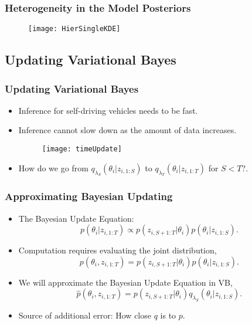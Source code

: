 \documentclass[11pt]{beamer}\usepackage[]{graphicx}\usepackage[]{color}
\begin{document}
\begin{frame}
\frametitle{Heterogeneity in the Model Posteriors}
\begin{figure}
\centering
\texttt{[image: HierSingleKDE]}
\end{figure}
\end{frame}

\begin{frame}
\section{Updating Variational Bayes}
\frametitle{Updating Variational Bayes}
\begin{itemize}
\item Inference for self-driving vehicles needs to be fast.
\item Inference cannot slow down as the amount of data increases.
\begin{figure}[ht]
\centering
\texttt{[image: timeUpdate]}
\end{figure}
\item How do we go from $q_{\lambda_S}(\theta_{i} | z_{i, 1:S})$ to $q_{\lambda_T}(\theta_{i} | z_{i, 1:T})$ for $S < T$?.
\end{itemize}
\end{frame}

\begin{frame}
\frametitle{Approximating Bayesian Updating}
\begin{itemize}
\item The Bayesian Update Equation: 
\begin{equation}
\label{updatePost}
p(\theta_{i} | z_{i, 1:T}) \propto p(z_{i, S+1:T} | \theta_{i})p(\theta_{i} | z_{i, 1:S}).
\end{equation}
\item Computation requires evaluating the joint distribution,
\begin{equation}
\label{updateJoint}
p(\theta_{i}, z_{i, 1:T}) = p(z_{i, S+1:T} | \theta_{i})p(\theta_{i} | z_{i, 1:S}).
\end{equation}
\item We will approximate the Bayesian Update Equation in VB,
\begin{equation}
\label{ApproxJoint}
\hat{p}(\theta_{i},  z_{i, 1:T}) = p(z_{i, S+1:T} | \theta_{i})q_{\lambda_S}(\theta_{i} | z_{i, 1:S}).
\end{equation}
\item Source of additional error: How close $q$ is to $p$.
\end{itemize}
\end{frame}
\end{document}
